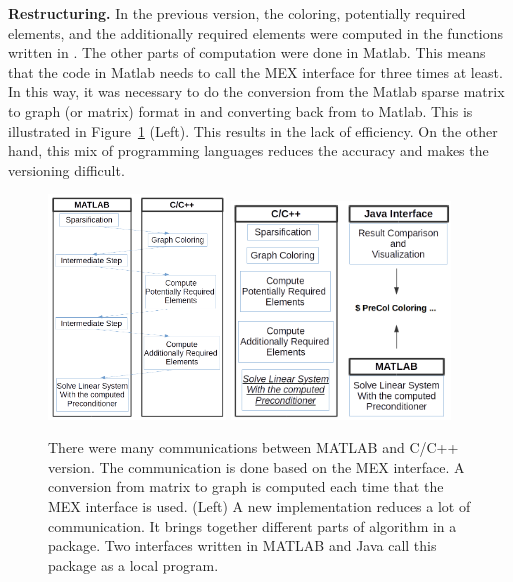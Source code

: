 \documentclass[12pt, oneside]{book}
\begin{document}
\textbf{Restructuring.}
In the previous version, the coloring, 
potentially required elements, and the additionally required elements
were computed in the functions written in .
The other parts of computation were done in Matlab.
This means that the code in Matlab needs to call the
MEX interface for three times at least. 
In this way, it was necessary to do the conversion from the Matlab sparse
matrix to graph (or matrix) format in 
and converting back from  to Matlab.
This is illustrated in Figure~\ref{f.structure} (Left).
This results in the lack of efficiency. On the other hand,
this mix of programming languages reduces 
the accuracy and makes the versioning difficult.
\begin{figure}
\centering
\includegraphics[width=0.42\textwidth]{old_struct}
\hfill
\includegraphics[width=0.52\textwidth]{new_struct}
\caption{There were many communications between MATLAB and C/C++ version. The communication
is done based on the MEX interface. A conversion from matrix to graph is computed
each time that the MEX interface is used. (Left) A new implementation reduces a lot of communication.
It brings together different parts of algorithm in a package. Two interfaces written
 in MATLAB and Java call this package as a local program.}
\label{f.structure}
\end{figure}
\end{document}

